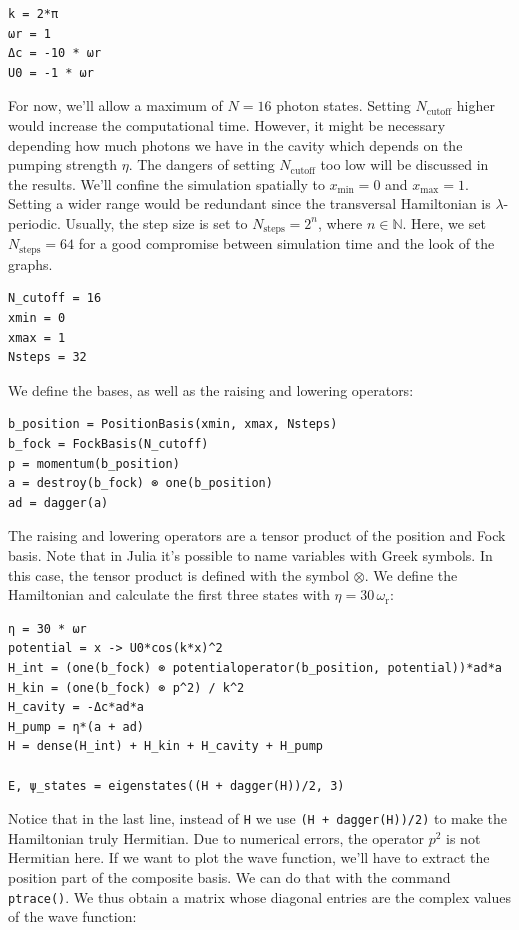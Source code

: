 \begin{lstlisting}
k = 2*π
ωr = 1
Δc = -10 * ωr
U0 = -1 * ωr
\end{lstlisting}For now, we'll allow a maximum of $N = 16$ photon states. Setting $N_\text{cutoff}$ higher would increase the computational time. However, it might be necessary depending how much photons we have in the cavity which depends on the pumping strength $\eta$. The dangers of setting $N_\text{cutoff}$ too low will be discussed in the results. We'll confine the simulation spatially to $x_\text{min} = 0$ and $x_\text{max} = 1$. Setting a wider range would be redundant since the transversal Hamiltonian is $\lambda$-periodic. Usually, the step size is set to $N_\text{steps} = 2^n$, where $n \in \mathbb{N}$. Here, we set $N_\text{steps} = 64$ for a good compromise between simulation time and the look of the graphs.

\begin{lstlisting}
N_cutoff = 16
xmin = 0
xmax = 1
Nsteps = 32
\end{lstlisting}We define the bases, as well as the raising and lowering operators:

\begin{lstlisting}
b_position = PositionBasis(xmin, xmax, Nsteps)
b_fock = FockBasis(N_cutoff)
p = momentum(b_position)
a = destroy(b_fock) ⊗ one(b_position)
ad = dagger(a)
\end{lstlisting}The raising and lowering operators are a tensor product of the position and Fock basis. Note that in Julia it's possible to name variables with Greek symbols. In this case, the tensor product is defined with the symbol $\otimes$. We define the Hamiltonian and calculate the first three states with $\eta = 30 \, \omega_\text{r}$:

\begin{lstlisting}
η = 30 * ωr
potential = x -> U0*cos(k*x)^2
H_int = (one(b_fock) ⊗ potentialoperator(b_position, potential))*ad*a
H_kin = (one(b_fock) ⊗ p^2) / k^2
H_cavity = -Δc*ad*a
H_pump = η*(a + ad)
H = dense(H_int) + H_kin + H_cavity + H_pump

E, ψ_states = eigenstates((H + dagger(H))/2, 3)
\end{lstlisting}Notice that in the last line, instead of \texttt{H} we use \texttt{(H + dagger(H))/2)} to make the Hamiltonian truly Hermitian. Due to numerical errors, the operator $p^2$ is not Hermitian here. If we want to plot the wave function, we'll have to extract the position part of the composite basis. We can do that with the command \texttt{ptrace()}. We thus obtain a matrix whose diagonal entries are the complex values of the wave function:

